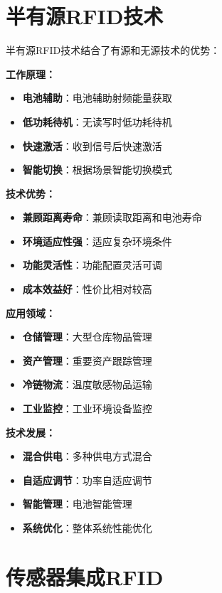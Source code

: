 \documentclass[12pt,UTF8]{ctexbook}
\begin{document}
\begin{itemize}[leftmargin=3.5em]
\begin{itemize}[leftmargin=3.5em]
\begin{itemize}[leftmargin=3.5em]
\begin{itemize}[leftmargin=3.5em]
\section{半有源RFID技术}

半有源RFID技术结合了有源和无源技术的优势：

\textbf{工作原理：}
\begin{itemize}[leftmargin=3.5em]
    \item \textbf{电池辅助}：电池辅助射频能量获取
    \item \textbf{低功耗待机}：无读写时低功耗待机
    \item \textbf{快速激活}：收到信号后快速激活
    \item \textbf{智能切换}：根据场景智能切换模式
\end{itemize}

\textbf{技术优势：}
\begin{itemize}[leftmargin=3.5em]
    \item \textbf{兼顾距离寿命}：兼顾读取距离和电池寿命
    \item \textbf{环境适应性强}：适应复杂环境条件
    \item \textbf{功能灵活性}：功能配置灵活可调
    \item \textbf{成本效益好}：性价比相对较高
\end{itemize}

\textbf{应用领域：}
\begin{itemize}[leftmargin=3.5em]
    \item \textbf{仓储管理}：大型仓库物品管理
    \item \textbf{资产管理}：重要资产跟踪管理
    \item \textbf{冷链物流}：温度敏感物品运输
    \item \textbf{工业监控}：工业环境设备监控
\end{itemize}

\textbf{技术发展：}
\begin{itemize}[leftmargin=3.5em]
    \item \textbf{混合供电}：多种供电方式混合
    \item \textbf{自适应调节}：功率自适应调节
    \item \textbf{智能管理}：电池智能管理
    \item \textbf{系统优化}：整体系统性能优化
\end{itemize}

\section{传感器集成RFID}


\end{itemize}
\end{itemize}
\end{itemize}
\end{itemize}
\end{document}
